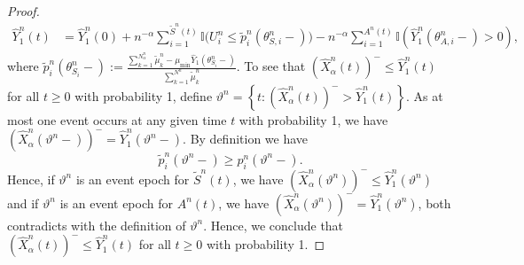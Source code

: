 \documentclass[a4paper,11pt,twoside]{article}
\numberwithin{equation}{section}
\numberwithin{figure}{section}
\theoremstyle{plain}
\newcommand{\II}{\mathbb{I}}
\newcommand{\1}{\mathbbm{1}}
\begin{document}
\begin{proof}
\begin{align*}
\hat{Y}_1^n(t)
&= 
\hat{Y}_1^n(0)
+n^{-\alpha}\sum_{i=1}^{\tilde{S}^n(t)}\II\Big(U_i^n\leq \tilde{p}_i^n\left(\theta_{S,i}^n-\right)\Big)
-n^{-\alpha}\sum_{i=1}^{A^n(t)}\II\left( \hat{Y}_1^n(\theta_{A,i}^n-)>0\right),
\end{align*}
where $\tilde{p}_i^n\left(\theta_{S_i}^n-\right):=\frac{\sum_{k=1}^{N^n_\alpha}\tilde{\mu}_k^n-\mu_{\min}\hat{Y}_1\left(\theta_{S_i}^n-\right)}{\sum_{k=1}^{N^n}\tilde{\mu}_k^n}$. To see that $\left(\hat{X}_\alpha^n(t)\right)^-\leq \hat{Y}_1^n(t)$ for all $t\geq 0$ with probability 1, define $\vartheta^n=\left\{t:\left(\hat{X}_\alpha^n(t)\right)^->\hat{Y}_1^n(t)\right\}$. As at most one event occurs at any given time $t$ with probability 1, we have $\left(\hat{X}_\alpha^n(\vartheta^n-)\right)^-=\hat{Y}_1^n(\vartheta^n-)$. By definition we have 
\[
\tilde{p}_i^n\left(\vartheta^n-\right)\geq p_i^n(\vartheta^n-).
\]
Hence, if  $\vartheta^n$ is an event epoch for $\tilde{S}^n(t)$, we have $\left(\hat{X}_\alpha^n(\vartheta^n)\right)^-\leq \hat{Y}_1^n(\vartheta^n)$ and if $\vartheta^n$ is an event epoch for $A^n(t)$, we have $\left(\hat{X}_\alpha^n(\vartheta^n)\right)^-= \hat{Y}_1^n(\vartheta^n)$, both contradicts with the definition of $\vartheta^n$. Hence, we conclude that $\left(\hat{X}_\alpha^n(t)\right)^-\leq \hat{Y}_1^n(t)$ for all $t\geq 0$ with probability 1. 


\end{proof}
\end{document}
